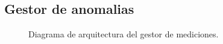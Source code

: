 \documentclass{article}
\theoremstyle{definition}
\theoremstyle{remark}
\begin{document}
\subsection{Gestor de anomalias}

\begin{figure}[H]
	\caption{Diagrama de arquitectura del gestor de mediciones.}
\end{figure}
\end{document}
